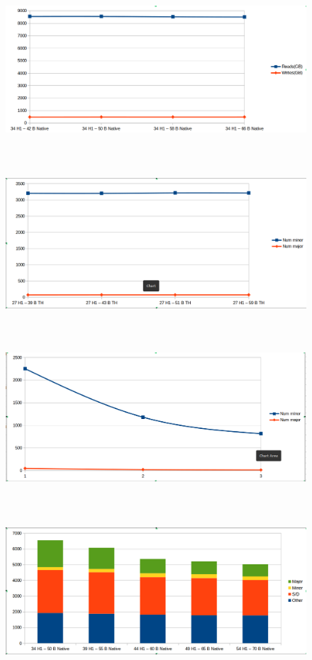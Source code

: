 \documentclass[twocolumn,10pt]{asme2e}
\begin{document}
\begin{figure}[h!]
        \includegraphics[width=12cm,height=6cm]{gcs_linr_pc_native.png}
\end{figure}

\begin{figure}[h!]
        \includegraphics[width=12cm,height=6cm]{gcs_linr_pc_th.png}
\end{figure}

\begin{figure}[h!]
        \includegraphics[width=12cm,height=6cm]{gcs_pr_h1_th.png}
\end{figure}

\begin{figure}[h!]
        \includegraphics[width=12cm,height=6cm]{linr_h1_native.png}
\end{figure}
\end{document}
